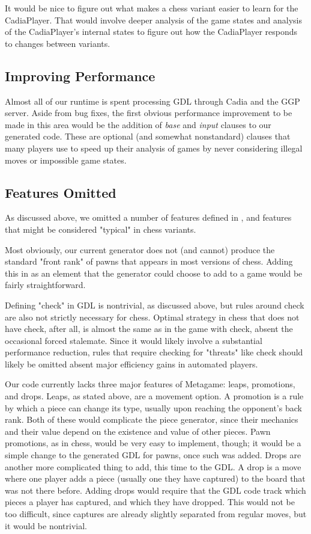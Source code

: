 \documentclass[11pt,letterpaper]{article}
\begin{document}
It would be nice to figure out what makes a chess variant easier to learn for the CadiaPlayer. That would involve deeper analysis of the game states and analysis of the CadiaPlayer's internal states to figure out how the CadiaPlayer responds to changes between variants.


\subsection{Improving Performance}

Almost all of our runtime is spent processing GDL through Cadia and the GGP
server. Aside from bug fixes, the first obvious performance improvement to be
made in this area would be the addition of \textit{base} and \textit{input}
clauses to our generated code. These are optional (and somewhat nonstandard)
clauses that many players use to speed up their analysis of games by never
considering illegal moves or impossible game states.

\subsection{Features Omitted}

As discussed above, we omitted a number of features defined in \cite{metagame},
and features that might be considered "typical" in chess variants.

Most obviously, our current generator does not (and cannot) produce the standard
"front rank" of pawns that appears in most versions of chess. Adding this in as
an element that the generator could choose to add to a game would be fairly
straightforward.

Defining "check" in GDL is nontrivial, as discussed above, but rules around
check are also not strictly necessary for chess. Optimal strategy in chess that
does not have check, after all, is almost the same as in the game with check,
absent the occasional forced stalemate. Since it would likely involve a
substantial performance reduction, rules that require checking for "threats"
like check should likely be omitted absent major efficiency gains in automated
players.

Our code currently lacks three major features of Metagame: leaps, promotions,
and drops. Leaps, as stated above, are a movement option. A promotion is a rule
by which a piece can change its type, usually upon reaching the opponent's back
rank. Both of these would complicate the piece generator, since their mechanics
and their value depend on the existence and value of other pieces. Pawn
promotions, as in chess, would be very easy to implement, though; it would be a
simple change to the generated GDL for pawns, once such was added. Drops are
another more complicated thing to add, this time to the GDL. A drop is a move
where one player adds a piece (usually one they have captured) to the board that
was not there before. Adding drops would require that the GDL code track which
pieces a player has captured, and which they have dropped. This would not be too
difficult, since captures are already slightly separated from regular moves, but
it would be nontrivial.
\end{document}
